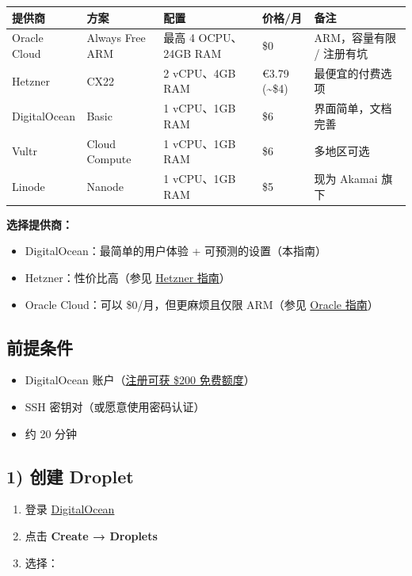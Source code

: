 \begin{table}[h]
\centering
\small
\begin{tabular}{|l|l|l|l|l|}
\hline
提供商 & 方案 & 配置 & 价格/月 & 备注 \\
\hline
Oracle Cloud & Always Free ARM & 最高 4 OCPU、24GB RAM & \$0 & ARM，容量有限 / 注册有坑 \\
\hline
Hetzner & CX22 & 2 vCPU、4GB RAM & €3.79 (\textasciitilde{}\$4) & 最便宜的付费选项 \\
\hline
DigitalOcean & Basic & 1 vCPU、1GB RAM & \$6 & 界面简单，文档完善 \\
\hline
Vultr & Cloud Compute & 1 vCPU、1GB RAM & \$6 & 多地区可选 \\
\hline
Linode & Nanode & 1 vCPU、1GB RAM & \$5 & 现为 Akamai 旗下 \\
\hline
\end{tabular}
\end{table}



\textbf{选择提供商：}

\begin{itemize}
  \item DigitalOcean：最简单的用户体验 + 可预测的设置（本指南）
  \item Hetzner：性价比高（参见 \href{/install/hetzner}{Hetzner 指南}）
  \item Oracle Cloud：可以 \$0/月，但更麻烦且仅限 ARM（参见 \href{/platforms/oracle}{Oracle 指南}）
\end{itemize}


\hrulefill


\subsection{前提条件}


\begin{itemize}
  \item DigitalOcean 账户（\href{https://m.do.co/c/signup}{注册可获 \$200 免费额度}）
  \item SSH 密钥对（或愿意使用密码认证）
  \item 约 20 分钟
\end{itemize}


\subsection{1) 创建 Droplet}


\begin{enumerate}
  \item 登录 \href{https://cloud.digitalocean.com/}{DigitalOcean}
  \item 点击 \textbf{Create → Droplets}
  \item 选择：
\end{enumerate}

